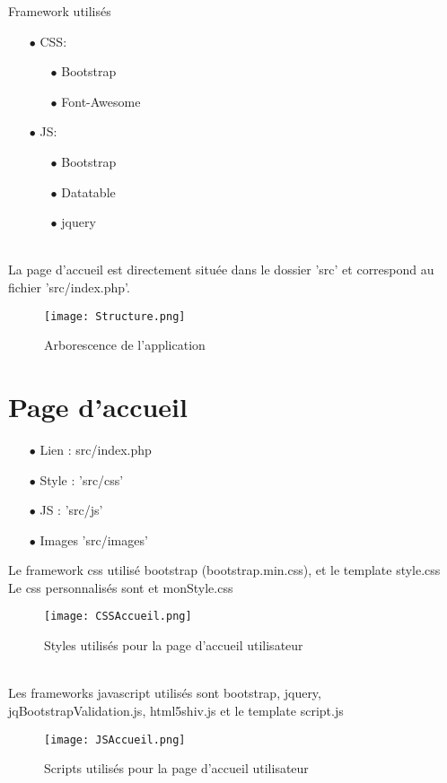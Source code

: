 \documentclass{article}
\begin{document}
Framework utilisés
\begin{itemize}
\item[$\bullet$] CSS: \begin{itemize}
        \item[$\bullet$] Bootstrap
        \item[$\bullet$] Font-Awesome
    \end{itemize}
\item[$\bullet$] JS: \begin{itemize}
        \item[$\bullet$] Bootstrap
        \item[$\bullet$] Datatable
        \item[$\bullet$] jquery
    \end{itemize}
\end{itemize}\\
La page d'accueil est directement située dans le dossier 'src' et correspond au fichier 'src/index.php'.

\begin{figure}[h!]
\centering
\texttt{[image: Structure.png]}
\caption{Arborescence de l'application}
\end{figure}


\section{Page d'accueil}

\begin{itemize}
\item[$\bullet$] Lien : src/index.php
\item[$\bullet$] Style : 'src/css'
\item[$\bullet$] JS : 'src/js'
\item[$\bullet$] Images 'src/images'
\end{itemize}

Le framework css utilisé bootstrap (bootstrap.min.css), et le template style.css\\
Le css personnalisés sont et monStyle.css\\
\begin{figure}[h!]
\centering
\texttt{[image: CSSAccueil.png]}
\caption{Styles utilisés pour la page d'accueil utilisateur}
\end{figure}

\\
Les frameworks javascript utilisés sont bootstrap, jquery, jqBootstrapValidation.js, html5shiv.js
et le template script.js\\
\begin{figure}[h!]
\centering
\texttt{[image: JSAccueil.png]}
\caption{Scripts utilisés pour la page d'accueil utilisateur}
\end{figure}
\end{document}
